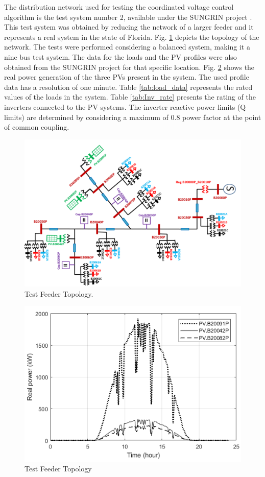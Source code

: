 The distribution network used for testing the coordinated voltage control algorithm is the test system number 2, available under the SUNGRIN project \cite{SG}. This test system was obtained by reducing the network of a larger feeder and it represents a real system in the state of Florida. Fig. \ref{fig:Feeder2} \cite{SG} depicts the topology of the network. The tests were performed considering a balanced system, making it a nine bus test system. The data for the loads and the PV profiles were also obtained from the SUNGRIN project for that specific location. Fig. \ref{fig:pv_data} shows the real power generation of the three PVs present in the system. The used profile data has a resolution of one minute. Table \ref{tab:load_data} represents the rated values of the loads in the system. Table \ref{tab:Inv_rate} presents the rating of the inverters connected to the PV systems. The inverter reactive power limits (Q limits) are determined by considering a maximum of 0.8 power factor at the point of common coupling. 

\begin{figure}[!h]
\centering
\includegraphics[width=0.85\linewidth]{figs/CVC/feeder.png}
\caption{Test Feeder Topology.}
\label{fig:Feeder2}
\end{figure}

\begin{figure}[!h]
\centering
\includegraphics[width=0.6\linewidth]{figs/CVC/PV_DATA.png}
\caption{Test Feeder Topology}
\label{fig:pv_data}
\end{figure}

